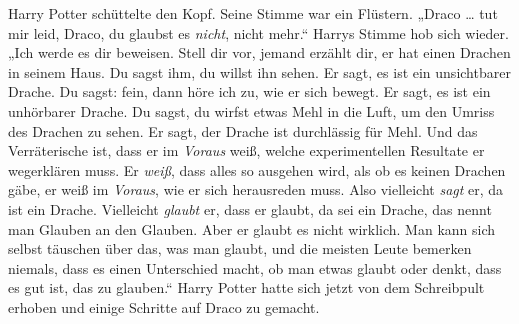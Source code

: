 Harry Potter schüttelte den Kopf. Seine Stimme war ein Flüstern.
„Draco … tut mir leid, Draco, du glaubst es \emph{nicht}, nicht mehr.“ Harrys Stimme hob sich wieder.
„Ich werde es dir beweisen. Stell dir vor, jemand erzählt dir, er hat einen Drachen in seinem Haus. Du sagst ihm, du willst ihn sehen. Er sagt, es ist ein unsichtbarer Drache. Du sagst: fein, dann höre ich zu, wie er sich bewegt. Er sagt, es ist ein unhörbarer Drache. Du sagst, du wirfst etwas Mehl in die Luft, um den Umriss des Drachen zu sehen. Er sagt, der Drache ist durchlässig für Mehl. Und das Verräterische ist, dass er im \emph{Voraus} weiß, welche experimentellen Resultate er wegerklären muss. Er \emph{weiß}, dass alles so ausgehen wird, als ob es keinen Drachen gäbe, er weiß im \emph{Voraus}, wie er sich herausreden muss. Also vielleicht \emph{sagt} er, da ist ein Drache. Vielleicht \emph{glaubt} er, dass er glaubt, da sei ein Drache, das nennt man Glauben an den Glauben. Aber er glaubt es nicht wirklich. Man kann sich selbst täuschen über das, was man glaubt, und die meisten Leute bemerken niemals, dass es einen Unterschied macht, ob man etwas glaubt oder denkt, dass es gut ist, das zu glauben.“ Harry Potter hatte sich jetzt von dem Schreibpult erhoben und einige Schritte auf Draco zu gemacht.
